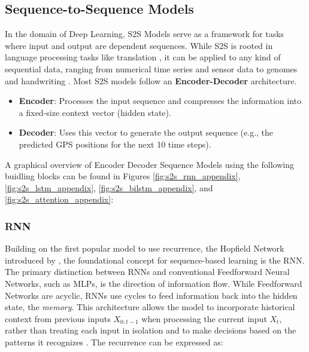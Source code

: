 \subsection{Sequence-to-Sequence Models}   


    In the domain of Deep Learning, \ac{S2S}  Models serve as a framework for tasks where input and output are dependent sequences. While \ac{S2S} is rooted in language processing tasks like translation \cite{sutskever2014sequencesequencelearningneural}, it can be %
    applied to any kind of sequential data, ranging from numerical time series and sensor data to genomes and handwriting \cite{gentleschmidt2019recurrentneuralnetworksrnns}. 
    Most \ac{S2S} models follow an \textbf{Encoder-Decoder} architecture. 
    \begin{itemize}
        \item \textbf{Encoder}: Processes the input sequence and compresses the information into a fixed-size context vector (hidden state).
        \item \textbf{Decoder}: Uses this vector to generate the output sequence (e.g., the predicted GPS positions for the next 10 time steps).
    \end{itemize}
    A graphical overview of Encoder Decoder Sequence Models using the following buidling blocks can be found in Figures \ref{fig:s2s_rnn_appendix}, \ref{fig:s2s_lstm_appendix}, \ref{fig:s2s_bilstm_appendix}, and \ref{fig:s2s_attention_appendix}:


    \subsubsection{RNN}
    Building on the first popular model to use recurrence, the Hopfield Network introduced by \cite{hopfieldrnn}, the foundational concept for sequence-based learning is the \ac{RNN}. 
    The primary distinction between \acp{RNN} and conventional Feedforward Neural Networks, such as \acp{MLP}, is the direction of information flow. While Feedforward Networks are acyclic, \acp{RNN} use cycles to feed information back into the hidden state, the \textit{memory}. This architecture allows the model to incorporate historical context from previous inputs $X_{0:t-1}$ when processing the current input $X_t$, rather than treating each input in isolation \cite{gentleschmidt2019recurrentneuralnetworksrnns} and to make decisions based on the patterns it recognizes \cite{AIBook}. The recurrence can be expressed as:

